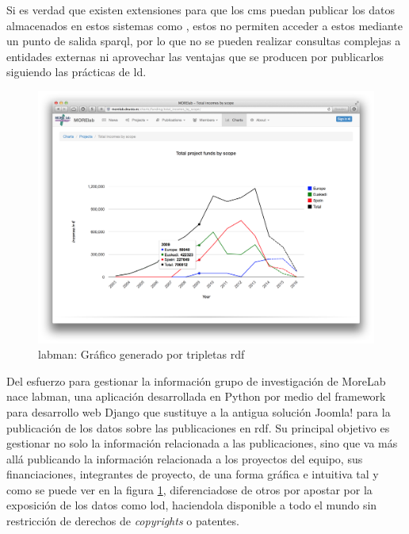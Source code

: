 Si es verdad que existen extensiones para que los \acrshort{cms} puedan publicar los datos almacenados en estos sistemas como , estos no permiten acceder a estos mediante un punto de salida \acrshort{sparql}, por lo que no se pueden realizar consultas complejas a entidades externas ni aprovechar las ventajas que se producen por publicarlos siguiendo las prácticas de \acrshort{ld}.

\begin{figure}[!htp]
	\centering
	\includegraphics[scale=0.21]{fig/labman-chart}
	\caption{\acrshort{labman}: Gráfico generado por tripletas \acrshort{rdf}}\label{fig:labmanchart}
\end{figure}

Del esfuerzo para gestionar la información grupo de investigación de MoreLab nace \acrshort{labman}, una aplicación desarrollada en Python\cite{Python} por medio del framework para desarrollo web Django\cite{Django} que sustituye a la antigua solución Joomla! para la publicación de los datos sobre las publicaciones en \acrfull{rdf}\cite{RDF}. Su principal objetivo es gestionar no solo la información relacionada a las publicaciones, sino que va más allá publicando la información relacionada a los proyectos del equipo, sus financiaciones, integrantes de proyecto, de una forma gráfica e intuitiva tal y como se puede ver en la figura \ref{fig:labmanchart}, diferenciadose de otros  por apostar por la exposición de los datos como \acrlong{lod}\cite{linkeddata}, haciendola disponible a todo el mundo sin restricción de derechos de \textit{copyrights} o patentes.\cite{pena_visual_2014}